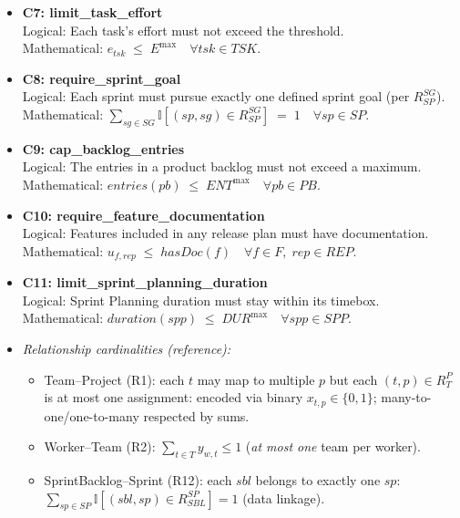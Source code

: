 \documentclass[11pt,a4paper]{article}
\begin{document}
\begin{itemize}[leftmargin=2em]
  \item \textbf{C7: limit\_task\_effort} \\
  Logical: Each task's effort must not exceed the threshold. \\
  Mathematical: $\displaystyle e_{tsk} \;\le\; E^{\max}\quad \forall tsk\in TSK$.

  \item \textbf{C8: require\_sprint\_goal} \\
  Logical: Each sprint must pursue exactly one defined sprint goal (per $R^{SG}_{SP}$). \\
  Mathematical: $\displaystyle \sum_{sg\in SG} \mathbb{I}[(sp,sg)\in R^{SG}_{SP}] \;=\; 1\quad \forall sp\in SP$.

  \item \textbf{C9: cap\_backlog\_entries} \\
  Logical: The entries in a product backlog must not exceed a maximum. \\
  Mathematical: $\displaystyle entries(pb) \;\le\; ENT^{\max}\quad \forall pb\in PB$.

  \item \textbf{C10: require\_feature\_documentation} \\
  Logical: Features included in any release plan must have documentation. \\
  Mathematical: $\displaystyle u_{f,rep} \;\le\; hasDoc(f)\quad \forall f\in F,\; rep\in REP$.

  \item \textbf{C11: limit\_sprint\_planning\_duration} \\
  Logical: Sprint Planning duration must stay within its timebox. \\
  Mathematical: $\displaystyle duration(spp) \;\le\; DUR^{\max}\quad \forall spp\in SPP$.

  \item \emph{Relationship cardinalities (reference):}
  \begin{itemize}
    \item Team--Project (R1): each $t$ may map to multiple $p$ but each $(t,p)\in R^{P}_{T}$ is at most one assignment: encoded via binary $x_{t,p}\in\{0,1\}$; many-to-one/one-to-many respected by sums.
    \item Worker--Team (R2): $\sum_{t\in T} y_{w,t}\le 1$ (\textit{at most one} team per worker).
    \item SprintBacklog--Sprint (R12): each $sbl$ belongs to exactly one $sp$: $\sum_{sp\in SP}\mathbb{I}[(sbl,sp)\in R^{SP}_{SBL}]=1$ (data linkage).
  \end{itemize}

\end{itemize}
\end{document}
